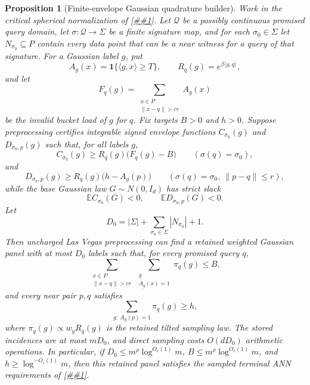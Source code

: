 \documentclass[10pt]{article}
\newcommand{\cref}[1]{\ref{##1}}
\newtheorem{proposition}[theorem]{Proposition}
\theoremstyle{definition}
\newcommand{\E}{\mathbb{E}}
\newcommand{\ip}[2]{\langle #1,#2\rangle}
\begin{document}
\begin{proposition}[Finite-envelope Gaussian quadrature builder]
   \label{prop:finite-envelope-gaussian-quadrature}
   Work in the critical spherical normalization of
   \cref{lem:critical-tilted-gaussian-sampled-spectrum}.  Let
   \(\mathcal Q\) be a possibly continuous promised query domain, let
   \(\sigma:\mathcal Q\to\Sigma\) be a finite signature map, and for each
   \(\sigma_0\in\Sigma\) let \(N_{\sigma_0}\subseteq P\) contain every data
   point that can be a near witness for a query of that signature.  For a
   Gaussian label \(g\), put
   \[
      A_g(x)=\mathbf 1\{\ip{g}{x}\ge T\},
      \qquad
      R_q(g)=e^{\beta\ip{g}{q}},
   \]
   and let
   \[
      F_q(g)=
      \sum_{\substack{x\in P\\ \|x-q\|>cr}}A_g(x)
   \]
   be the invalid bucket load of \(g\) for \(q\).  Fix targets \(B>0\) and
   \(h>0\).  Suppose preprocessing certifies integrable signed envelope
   functions \(C_{\sigma_0}(g)\) and \(D_{\sigma_0,p}(g)\) such that, for all
   labels \(g\),
   \[
      C_{\sigma_0}(g)
      \ge
      R_q(g)\bigl(F_q(g)-B\bigr)
      \qquad(\sigma(q)=\sigma_0),
      \tag{FE1}
   \]
   and
   \[
      D_{\sigma_0,p}(g)
      \ge
      R_q(g)\bigl(h-A_g(p)\bigr)
      \qquad
      (\sigma(q)=\sigma_0,\ \|p-q\|\le r),
      \tag{FE2}
   \]
   while the base Gaussian law \(G\sim N(0,I_d)\) has strict slack
   \[
      \E C_{\sigma_0}(G)<0,
      \qquad
      \E D_{\sigma_0,p}(G)<0.
      \tag{FE3}
   \]
   Let
   \[
      D_0=|\Sigma|+\sum_{\sigma_0\in\Sigma}|N_{\sigma_0}|+1 .
   \]
   Then uncharged Las Vegas preprocessing can find a retained weighted
   Gaussian panel with at most \(D_0\) labels such that, for every promised
   query \(q\),
   \[
      \sum_{\substack{x\in P\\ \|x-q\|>cr}}
      \sum_{\substack{g\\ A_g(x)=1}}\pi_q(g)
      \le B ,
      \tag{FE4}
   \]
   and every near pair \(p,q\) satisfies
   \[
      \sum_{g:\ A_g(p)=1}\pi_q(g)\ge h ,
      \tag{FE5}
   \]
   where \(\pi_q(g)\propto w_gR_q(g)\) is the retained tilted sampling law.
   The stored incidences are at most \(mD_0\), and direct sampling costs
   \(O(dD_0)\) arithmetic operations.  In particular, if
   \(D_0\le m^\rho\log^{O_c(1)}m\), \(B\le m^\rho\log^{O_c(1)}m\), and
   \(h\ge\log^{-O_c(1)}m\), then this retained panel satisfies the sampled
   terminal ANN requirements of \cref{prop:sampled-structured-panel}.
\end{proposition}
\end{document}

